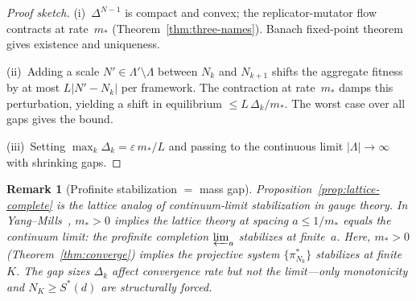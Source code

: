 \documentclass[11pt,a4paper]{article}
\newtheorem{remark}[theorem]{Remark}
\begin{document}
\begin{proof}[Proof sketch]
\textup{(i)}~$\Delta^{N-1}$ is compact and convex;
the replicator-mutator flow contracts at rate~$m_*$
(Theorem~\ref{thm:three-names}).
Banach fixed-point theorem gives existence and uniqueness.

\textup{(ii)}~Adding a scale $N' \in \Lambda' \setminus \Lambda$
between $N_k$ and $N_{k+1}$ shifts the aggregate fitness
by at most $L |N' - N_k|$ per framework.
The contraction at rate~$m_*$ damps this perturbation,
yielding a shift in equilibrium
$\leq L\,\Delta_k / m_*$.
The worst case over all gaps gives the bound.

\textup{(iii)}~Setting $\max_k \Delta_k = \varepsilon\, m_* / L$
and passing to the continuous limit
$|\Lambda| \to \infty$ with shrinking gaps.
\end{proof}

\begin{remark}[Profinite stabilization $=$ mass gap]%
\label{rem:profinite-stabilize}
Proposition~\ref{prop:lattice-complete} is the lattice
analog of continuum-limit stabilization in gauge theory.
In Yang--Mills~\cite{YM54}, $m_* > 0$ implies the lattice theory
at spacing $a \leq 1/m_*$ equals the continuum limit:
the profinite completion $\varprojlim_a$ stabilizes at
finite~$a$.
Here, $m_* > 0$ (Theorem~\ref{thm:converge}) implies
the projective system $\{\pi^*_{N_k}\}$ stabilizes at
finite~$K$.
The gap sizes $\Delta_k$ affect convergence \emph{rate}
but not the limit---only monotonicity and
$N_K \geq S^*(d)$ are structurally forced.
\end{remark}
\end{document}
